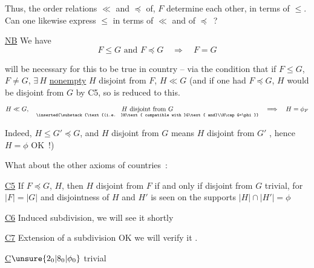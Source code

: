 
Thus, the order relations $\ll$ and $\preceq$ of, $F$ determine each other, in terms of $\leq$. Can one likewise express $\leq$ in terms of $\ll$ and of $\preceq$~?

\uline{NB} We have
\[
 F\leq G\text{ and }F\preceq G\quad\Longrightarrow\quad F=G
\]

 will be necessary for this to be true in  country -- via the condition that if $F\leq G$, $F\ne G$, $\exists\,H$ \uline{nonempty}  $H$ disjoint from $F$, $H\ll G$ (and if one had $F\preceq G$, $H$ would be disjoint from $G$ by C5, so  is reduced to this. 
\[
 H\ll G,\quad
 \underset{\inserted{\substack{\text{(i.e. }H\text{ compatible with }G\text{ and}\\H\cap G=\phi}}}{H\text{ disjoint from }G}
 \quad\Longrightarrow\quad H=\phi_{F}
\]

Indeed, $H\leq G'\preceq G$,  and $H$ disjoint from $G$ means $H$ disjoint from $G'$ , hence $H=\phi$ OK~!)


What about the other axioms of countries~:

\uline{C5} If $F\preceq G$, $H$, then $H$ disjoint from $F$ if and only if disjoint from $G$ trivial, for $|F|=|G|$ and disjointness of $H$ and $H'$ is seen on the supports  $|H|\cap|H'|=\phi$

\uline{C6} Induced subdivision, we will see it shortly

\uline{C7} Extension of a subdivision OK we will verify it .

\uline{C}$\unsure{2_0|8_0|\phi_0}$ trivial
